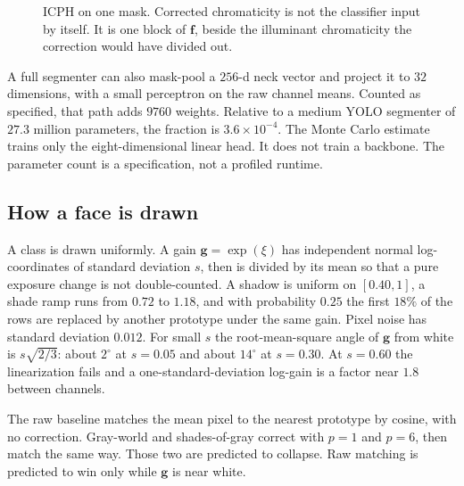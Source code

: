 \documentclass[10pt]{article}
\begin{document}
\begin{figure}[t]
\centering
{}
\caption{ICPH on one mask. Corrected chromaticity is not the classifier input by itself. It is one block of $\mathbf{f}$, beside the illuminant chromaticity the correction would have divided out.}
\label{fig:head}
\end{figure}

A full segmenter can also mask-pool a $256$-d neck vector and project it to $32$ dimensions, with a small perceptron on the raw channel means. Counted as specified, that path adds $9760$ weights. Relative to a medium YOLO segmenter of $27.3$ million parameters, the fraction is $3.6\times 10^{-4}$. The Monte Carlo estimate trains only the eight-dimensional linear head. It does not train a backbone. The parameter count is a specification, not a profiled runtime.

\subsection{How a face is drawn}
A class is drawn uniformly. A gain $\mathbf{g}=\exp(\xi)$ has independent normal log-coordinates of standard deviation $s$, then is divided by its mean so that a pure exposure change is not double-counted. A shadow is uniform on $[0.40,1]$, a shade ramp runs from $0.72$ to $1.18$, and with probability $0.25$ the first $18\%$ of the rows are replaced by another prototype under the same gain. Pixel noise has standard deviation $0.012$. For small $s$ the root-mean-square angle of $\mathbf{g}$ from white is $s\sqrt{2/3}$: about $2^{\circ}$ at $s=0.05$ and about $14^{\circ}$ at $s=0.30$. At $s=0.60$ the linearization fails and a one-standard-deviation log-gain is a factor near $1.8$ between channels.

The raw baseline matches the mean pixel to the nearest prototype by cosine, with no correction. Gray-world and shades-of-gray correct with $p=1$ and $p=6$, then match the same way. Those two are predicted to collapse. Raw matching is predicted to win only while $\mathbf{g}$ is near white.
\end{document}
